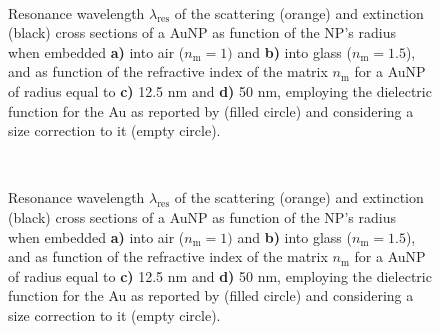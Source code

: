 
%
%
%



\begin{figure}
    \hspace*{-18.75em}%
    \vspace*{-1.25em}%
        \begin{subfigure}{.375\textwidth}\caption{ }\label{sfig:red:1}\end{subfigure}%
        \begin{subfigure}{.25\textwidth}\caption{ }\label{sfig:red:2}\end{subfigure} \\
    \def\svgwidth{.95\textwidth}
    \small
    \centering
    \vspace*{0em}
    \caption[Spectral redshift of the scattering and extinction of a spherical AuNP as function of its size and the embedding media]{Resonance wavelength $\lambda_\text{res}$ of the scattering (orange) and extinction (black) cross sections of a AuNP as function of the NP's radius when embedded \textbf{a)} into air ($n_\text{m} = 1)$ and \textbf{b)} into glass ($n_\text{m} = 1.5$), and as function of the refractive index of the matrix  $n_\text{m}$ for a AuNP of radius equal to  \textbf{c)} 12.5 nm and \textbf{d)} 50 nm, employing the dielectric function for the Au as reported by \citeauthor{johnson_optical_1972} (filled circle) and considering a size correction to it (empty circle).}
\end{figure}


\begin{figure}
    \hspace*{-18.75em}%
    \vspace*{-1.25em}%
        \begin{subfigure}{.375\textwidth}\caption{ }\label{sfig:red:1}\end{subfigure}%
        \begin{subfigure}{.25\textwidth}\caption{ }\label{sfig:red:2}\end{subfigure} \\
    \def\svgwidth{.9\textwidth}
    \centering
    \vspace*{0em}
    \caption[Spectral redshift of the scattering and extinction of a spherical AuNP as function of its size and the embedding media]{Resonance wavelength $\lambda_\text{res}$ of the scattering (orange) and extinction (black) cross sections of a AuNP as function of the NP's radius when embedded \textbf{a)} into air ($n_\text{m} = 1)$ and \textbf{b)} into glass ($n_\text{m} = 1.5$), and as function of the refractive index of the matrix  $n_\text{m}$ for a AuNP of radius equal to  \textbf{c)} 12.5 nm and \textbf{d)} 50 nm, employing the dielectric function for the Au as reported by \citeauthor{johnson_optical_1972} (filled circle) and considering a size correction to it (empty circle).}
\end{figure}



